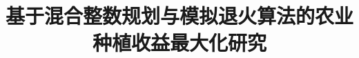\documentclass[withoutpreface,bwprint]{cumcmthesis} %
\title{基于混合整数规划与模拟退火算法的农业种植收益最大化研究}
\newif\ifhasreferences
\begin{document}
\maketitle















\ifhasreferences
\fi

\newpage

\end{document}
